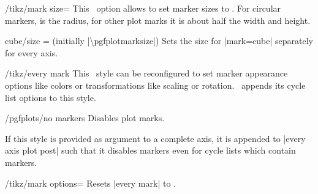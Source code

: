 \begin{key}{/tikz/mark size=}
	This \Tikz\ option allows to set marker sizes to . For circular markers,  is the radius, for other plot marks it is about half the width and height.
\end{key}

\begin{pgfplotsxykey}{cube/size \x= (initially |\textbackslash pgfplotmarksize|)}
	Sets the size for |mark=cube| separately for every axis.
\end{pgfplotsxykey}
\begin{key}{/tikz/every mark}
	This \Tikz\ style can be reconfigured to set marker appearance options like colors or transformations like scaling or rotation. \PGFPlots\ appends its cycle list options to this style.
\begin{codeexample}[]
\end{codeexample}

\begin{codeexample}[]
\end{codeexample}
\end{key}

\begin{stylekey}{/pgfplots/no markers}
	Disables plot marks.

	If this style is provided as argument to a complete axis, it is appended to |every axis plot post| such that it disables markers even for cycle lists which contain markers.
\end{stylekey}

\begin{key}{/tikz/mark options=}
	Resets |every mark| to .
\end{key}


